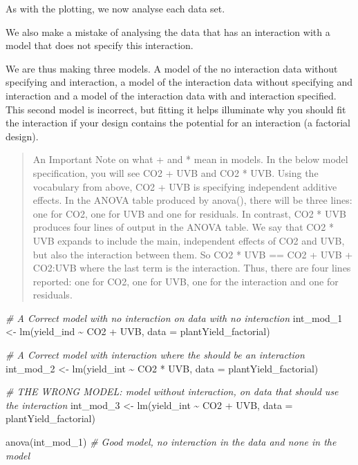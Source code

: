 \documentclass[
]{book}
\newenvironment{Shaded}{\begin{snugshade}}{\end{snugshade}}
\newcommand{\AttributeTok}[1]{\textcolor[rgb]{0.77,0.63,0.00}{#1}}
\newcommand{\CommentTok}[1]{\textcolor[rgb]{0.56,0.35,0.01}{\textit{#1}}}
\newcommand{\FunctionTok}[1]{\textcolor[rgb]{0.00,0.00,0.00}{#1}}
\newcommand{\NormalTok}[1]{#1}
\newcommand{\OtherTok}[1]{\textcolor[rgb]{0.56,0.35,0.01}{#1}}
\newcommand{\SpecialCharTok}[1]{\textcolor[rgb]{0.00,0.00,0.00}{#1}}
\begin{document}
As with the plotting, we now analyse each data set.

We also make a mistake of analysing the data that has an interaction with a model that does not specify this interaction.

We are thus making three models. A model of the no interaction data without specifying and interaction, a model of the interaction data without specifying and interaction and a model of the interaction data with and interaction specified. This second model is incorrect, but fitting it helps illuminate why you should fit the interaction if your design contains the potential for an interaction (a factorial design).

\begin{quote}
An Important Note on what + and * mean in models. In the below model specification, you will see CO2 + UVB and CO2 * UVB. Using the vocabulary from above, CO2 + UVB is specifying independent additive effects. In the ANOVA table produced by anova(), there will be three lines: one for CO2, one for UVB and one for residuals. In contrast, CO2 * UVB produces four lines of output in the ANOVA table. We say that CO2 * UVB expands to include the main, independent effects of CO2 and UVB, but also the interaction between them. So CO2 * UVB == CO2 + UVB + CO2:UVB where the last term is the interaction. Thus, there are four lines reported: one for CO2, one for UVB, one for the interaction and one for residuals.
\end{quote}

\begin{Shaded}
\begin{Highlighting}[]
\CommentTok{\# A Correct model with no interaction on data with no interaction}
\NormalTok{int\_mod\_1 }\OtherTok{\textless{}{-}} \FunctionTok{lm}\NormalTok{(yield\_ind }\SpecialCharTok{\textasciitilde{}}\NormalTok{ CO2 }\SpecialCharTok{+}\NormalTok{ UVB, }\AttributeTok{data =}\NormalTok{ plantYield\_factorial)}

\CommentTok{\# A Correct model with interaction where the should be an interaction}
\NormalTok{int\_mod\_2 }\OtherTok{\textless{}{-}} \FunctionTok{lm}\NormalTok{(yield\_int }\SpecialCharTok{\textasciitilde{}}\NormalTok{ CO2 }\SpecialCharTok{*}\NormalTok{ UVB, }\AttributeTok{data =}\NormalTok{ plantYield\_factorial)}

\CommentTok{\# THE WRONG MODEL: model without interaction, on data that should use the interaction}
\NormalTok{int\_mod\_3 }\OtherTok{\textless{}{-}} \FunctionTok{lm}\NormalTok{(yield\_int }\SpecialCharTok{\textasciitilde{}}\NormalTok{ CO2 }\SpecialCharTok{+}\NormalTok{ UVB, }\AttributeTok{data =}\NormalTok{ plantYield\_factorial)}

\FunctionTok{anova}\NormalTok{(int\_mod\_1) }\CommentTok{\# Good model, no interaction in the data and none in the model}
\end{Highlighting}
\end{Shaded}
\end{document}
